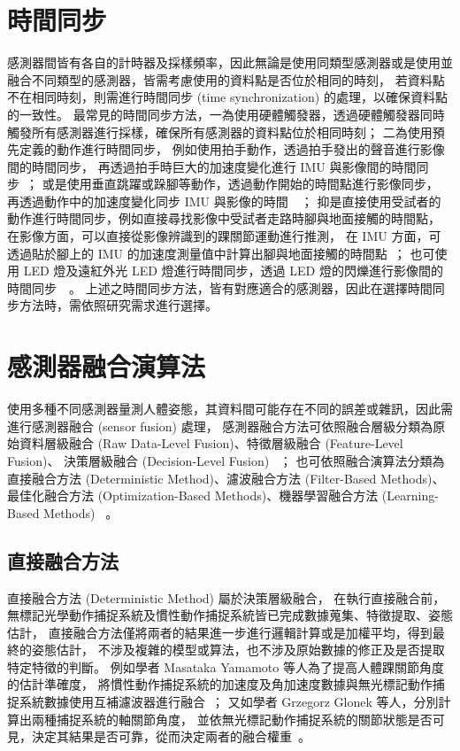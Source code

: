 \section{時間同步}
感測器間皆有各自的計時器及採樣頻率，因此無論是使用同類型感測器或是使用並融合不同類型的感測器，皆需考慮使用的資料點是否位於相同的時刻，
若資料點不在相同時刻，則需進行時間同步 (time synchronization) 的處理，以確保資料點的一致性。
最常見的時間同步方法，一為使用硬體觸發器，透過硬體觸發器同時觸發所有感測器進行採樣，確保所有感測器的資料點位於相同時刻；
二為使用預先定義的動作進行時間同步，
例如使用拍手動作，透過拍手發出的聲音進行影像間的時間同步，
再透過拍手時巨大的加速度變化進行 IMU 與影像間的時間同步~\cite{pons2012data}；
或是使用垂直跳躍或跺腳等動作，透過動作開始的時間點進行影像同步，
再透過動作中的加速度變化同步 IMU 與影像的時間~\cite{destelle2014low}~\cite{Trumble:BMVC:2017}；
抑是直接使用受試者的動作進行時間同步，例如直接尋找影像中受試者走路時腳與地面接觸的時間點，
在影像方面，可以直接從影像辨識到的踝關節運動進行推測，
在 IMU 方面，可透過貼於腳上的 IMU 的加速度測量值中計算出腳與地面接觸的時間點~\cite{kaichi2020resolving}；
也可使用 LED 燈及遠紅外光 LED 燈進行時間同步，透過 LED 燈的閃爍進行影像間的時間同步~\cite{nakano2020evaluation}~\cite{needham2021accuracy}。
上述之時間同步方法，皆有對應適合的感測器，因此在選擇時間同步方法時，需依照研究需求進行選擇。

\section{感測器融合演算法}
使用多種不同感測器量測人體姿態，其資料間可能存在不同的誤差或雜訊，因此需進行感測器融合 (sensor fusion) 處理，
感測器融合方法可依照融合層級分類為原始資料層級融合 (Raw Data-Level Fusion)、特徵層級融合 (Feature-Level Fusion)、
決策層級融合 (Decision-Level Fusion) ~\cite{majumder2020vision}；
也可依照融合演算法分類為直接融合方法 (Deterministic Method)、濾波融合方法 (Filter-Based Methods)、
最佳化融合方法 (Optimization-Based Methods)、機器學習融合方法 (Learning-Based Methods) ~\cite{li2023visual}。


\subsection*{直接融合方法}
直接融合方法 (Deterministic Method) 屬於決策層級融合，
在執行直接融合前，無標記光學動作捕捉系統及慣性動作捕捉系統皆已完成數據蒐集、特徵提取、姿態估計，
直接融合方法僅將兩者的結果進一步進行邏輯計算或是加權平均，得到最終的姿態估計，
不涉及複雜的模型或算法，也不涉及原始數據的修正及是否提取特定特徵的判斷。
例如學者 Masataka Yamamoto 等人為了提高人體踝關節角度的估計準確度，
將慣性動作捕捉系統的加速度及角加速度數據與無光標記動作捕捉系統數據使用互補濾波器進行融合~\cite{yamamoto2022verification}；
又如學者 Grzegorz Glonek 等人，分別計算出兩種捕捉系統的軸關節角度，
並依無光標記動作捕捉系統的關節狀態是否可見，決定其結果是否可靠，從而決定兩者的融合權重~\cite{s17122857}。

